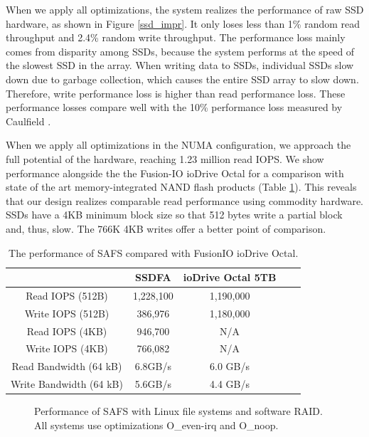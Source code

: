 When we apply all optimizations, the system realizes
the performance of raw SSD hardware, as shown in Figure \ref{ssd_impr}.
It only loses less than 1\% random read throughput
and 2.4\% random write throughput. The performance loss mainly comes from
disparity among SSDs, because the system performs at the speed
of the slowest SSD in the array.
When writing data to SSDs, individual SSDs slow down due to garbage
collection, which causes the entire SSD array to slow down. Therefore, write
performance loss is higher than read performance loss. 
These performance losses compare well with the 
10\% performance loss measured by Caulfield \cite{Caulfield10}.

When we apply all optimizations in the NUMA configuration, we approach the 
full potential of the hardware, reaching 1.23 million read IOPS.
We show performance alongside the
the Fusion-IO ioDrive Octal \cite{fusion} for a comparison with state of the 
art memory-integrated NAND flash products (Table \ref{beat_fusion}). 
This reveals that our design realizes comparable
read performance using commodity hardware.
SSDs have a 4KB minimum block size so that 512 bytes write a partial block 
and, thus, slow.  The 766K 4KB writes offer a better point of comparison.

\begin{table}
\begin{center}
\small
\begin{tabular}{|c|c|c|c|c|}
\hline
& SSDFA & ioDrive Octal 5TB \\
\hline
Read IOPS (512B) & 1,228,100 & 1,190,000 \\
\hline
Write IOPS (512B) & 386,976 & 1,180,000 \\
\hline
Read IOPS (4KB) & 946,700 & N/A \\
\hline
Write IOPS (4KB) & 766,082 & N/A \\
\hline
Read Bandwidth (64 kB) & 6.8GB/s & 6.0 GB/s \\
\hline
Write Bandwidth (64 kB) & 5.6GB/s & 4.4 GB/s \\
\hline
\end{tabular}
\normalsize
\end{center}
\caption{The performance of SAFS compared with FusionIO ioDrive Octal.}
\label{beat_fusion}
\end{table}

\begin{figure}[tb]
\begin{center}
\vspace{-15pt}

\vspace{-15pt}
\caption{Performance of SAFS with Linux file systems and software RAID.
All systems use optimizations O\_even-irq and O\_noop.}
\label{vs_soft_raid}
\end{center}
\end{figure}


